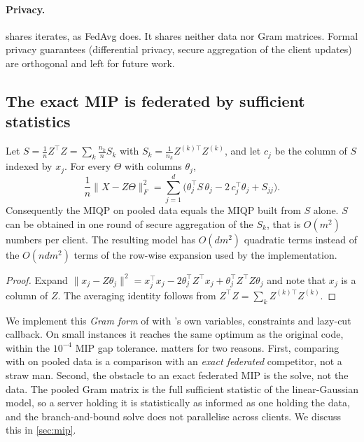 \paragraph{Privacy.}
\feddbn{} shares iterates, as FedAvg does. It shares neither data nor Gram matrices. Formal
privacy guarantees (differential privacy, secure aggregation of the client updates) are
orthogonal and left for future work.

\subsection{The exact MIP is federated by sufficient statistics}

\begin{proposition}
\label{prop:gram}
Let $S=\frac1n Z^\top Z=\sum_k\frac{n_k}{n}S_k$ with $S_k=\frac1{n_k}Z^{(k)\top}Z^{(k)}$, and
let $c_j$ be the column of $S$ indexed by $x_j$. For every $\Theta$ with columns $\theta_j$,
\[
  \frac{1}{n}\|X-Z\Theta\|_F^2=\sum_{j=1}^{d}\big(\theta_j^\top S\,\theta_j-2\,c_j^\top\theta_j+S_{jj}\big).
\]
Consequently the \exdbn{} MIQP on pooled data equals the MIQP built from $S$ alone. $S$ can be
obtained in one round of secure aggregation \citep{bonawitz2017secagg} of the $S_k$, that is
$O(m^2)$ numbers per client. The resulting model has $O(dm^2)$ quadratic terms instead of the
$O(ndm^2)$ terms of the row-wise expansion used by the \exdbn{} implementation.
\end{proposition}
\begin{proof}
Expand $\|x_j-Z\theta_j\|^2=x_j^\top x_j-2\theta_j^\top Z^\top x_j+\theta_j^\top Z^\top Z\theta_j$
and note that $x_j$ is a column of $Z$. The averaging identity follows from
$Z^\top Z=\sum_k Z^{(k)\top}Z^{(k)}$.
\end{proof}

We implement this \emph{Gram form} of \exdbn{} with \exdbn's own variables, constraints and
lazy-cut callback. On small instances it reaches the same optimum as the original code, within
the $10^{-4}$ MIP gap tolerance.  matters for two reasons. First, comparing
\feddbn{} with \exdbn{} on pooled data is a comparison with an \emph{exact federated}
competitor, not a straw man. Second, the obstacle to an exact federated MIP is the solve,
not the data. The pooled Gram matrix is the full sufficient statistic of the linear-Gaussian
model, so a server holding it is statistically as informed as one holding the data, and the
branch-and-bound solve does not parallelise across clients. We discuss this in \cref{sec:mip}.

